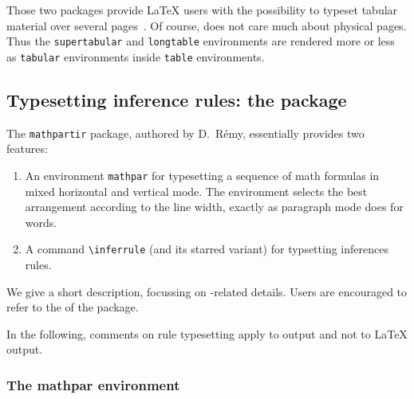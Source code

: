 Those two packages provide \LaTeX{} users with the
possibility to typeset tabular material over several
pages~\cite[Section~5.4]{latexbis}. Of course, \hevea{}
does not care much about physical pages.
Thus the \texttt{supertabular}
and \texttt{longtable} environments are rendered more or less
as \texttt{tabular} environments inside \texttt{table} environments.

\subsection{Typesetting inference rules: the
\label{mathpartir:package}  package}
%
The \texttt{mathpartir} package, authored by D.~R\'emy, essentially
provides two features:
\begin{enumerate}
\item
An environment \texttt{mathpar} for typesetting a sequence of math formulas in mixed horizontal and vertical mode. The environment selects the best arrangement according to the line width, exactly as paragraph mode does for words.
\item A command \verb+\inferrule+ (and its starred variant) for
typsetting inferences rules.
\end{enumerate}
We give a short description, focussing on \hevea{}-related details.
Users are encouraged to refer to the
 of the package.

In the following, comments on rule typesetting apply to \hevea{} output
and not to \LaTeX{} output.

\subsubsection {The mathpar environment}

